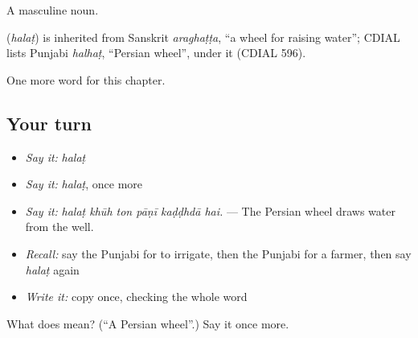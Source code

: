 A masculine noun.

\begin{cousinweb}
\textbf{} (\emph{halaṭ}) is inherited from Sanskrit \emph{araghaṭṭa}, \textquotedblleft{}a wheel for raising water\textquotedblright{}; CDIAL lists Punjabi \emph{halhaṭ}, \textquotedblleft{}Persian wheel\textquotedblright{}, under it (CDIAL 596).
\end{cousinweb}

\begin{grammarlens}[title={What you've built}]
One more word for this chapter.
\end{grammarlens}

\subsection*{Your turn}
\begin{itemize}
\raggedright
  \item \emph{Say it:} \emph{halaṭ}
  \item \emph{Say it:} \emph{halaṭ}, once more
  \item \emph{Say it:} \emph{halaṭ khūh ton pāṇī kaḍḍhdā hai.} — The Persian wheel draws water from the well.
  \item \emph{Recall:} say the Punjabi for to irrigate, then the Punjabi for a farmer, then say \emph{halaṭ} again
  \item \emph{Write it:} copy \textbf{} once, checking the whole word
\end{itemize}

\begin{tcolorbox}[breakable,colback=teal!4,colframe=teal!35!black,title={Before you move on}]
What does  mean? (\textquotedblleft{}A Persian wheel\textquotedblright{}.) Say it once more.
\end{tcolorbox}
